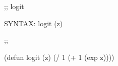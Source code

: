 \begin{aibox}{\function}
;; logit

SYNTAX: logit (z) 
\end{aibox}

\begin{aibox}{\examples}

\end{aibox}

\begin{aibox}{\comments}

\end{aibox}
\begin{aibox}{\answers}

\end{aibox}
\begin{aibox}{\othercomments}

\end{aibox}
\begin{aibox}{\pseudocode}

\end{aibox}
\begin{aibox}{\code}

;;%

(defun logit (z) 
	(/ 1
		(+ 1 (exp z))))

\end{aibox}
